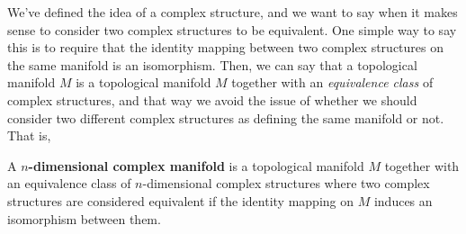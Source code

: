 \documentclass{article}
\begin{document}
We've defined the idea of a complex structure, and we want to say when it makes sense to consider two complex structures to be equivalent. One simple way to say this is to require that the identity mapping between two complex structures on the same manifold is an isomorphism. Then, we can say that a topological manifold \(M\) is a topological manifold \(M\) together with an \textit{equivalence class} of complex structures, and that way we avoid the issue of whether we should consider two different complex structures as defining the same manifold or not. That is,

\begin{definition}
A \textbf{\(n\)-dimensional complex manifold} is a topological manifold \(M\) together with an equivalence class of \(n\)-dimensional complex structures where two complex structures are considered equivalent if the identity mapping on \(M\) induces an isomorphism between them.
\end{definition}
\end{document}
